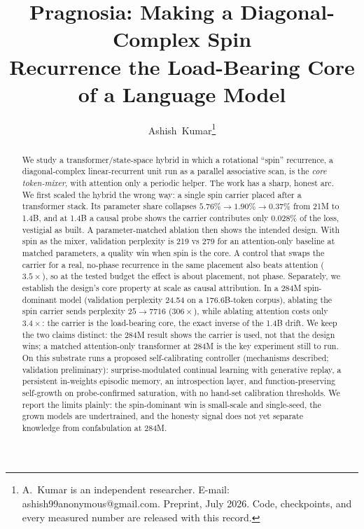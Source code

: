 \documentclass[journal]{IEEEtran}
\begin{document}
\title{Pragnosia: Making a Diagonal-Complex Spin\\ Recurrence the Load-Bearing Core of a Language Model}

\author{Ashish~Kumar\thanks{A.~Kumar is an independent researcher. E-mail: ashish99anonymous@gmail.com. Preprint, July 2026. Code, checkpoints, and every measured number are released with this record.}}


\maketitle

\begin{abstract}
We study a transformer/state-space hybrid in which a rotational ``spin'' recurrence, a diagonal-complex linear-recurrent unit run as a parallel associative scan, is the \emph{core token-mixer}, with attention only a periodic helper. The work has a sharp, honest arc. We first scaled the hybrid the wrong way: a single spin carrier placed after a transformer stack. Its parameter share collapses $5.76\% \to 1.90\% \to 0.37\%$ from 21M to 1.4B, and at 1.4B a causal probe shows the carrier contributes only 0.028\% of the loss, vestigial as built. A parameter-matched ablation then shows the intended design. With spin as the mixer, validation perplexity is 219 vs 279 for an attention-only baseline at matched parameters, a quality win when spin is the core. A control that swaps the carrier for a real, no-phase recurrence in the same placement also beats attention ($3.5\times$), so at the tested budget the effect is about placement, not phase. Separately, we establish the design's core property at scale as causal attribution. In a 284M spin-dominant model (validation perplexity 24.54 on a 176.6B-token corpus), ablating the spin carrier sends perplexity $25 \to 7716$ ($306\times$), while ablating attention costs only $3.4\times$: the carrier is the load-bearing core, the exact inverse of the 1.4B drift. We keep the two claims distinct: the 284M result shows the carrier is used, not that the design wins; a matched attention-only transformer at 284M is the key experiment still to run. On this substrate runs a proposed self-calibrating controller (mechanisms described; validation preliminary): surprise-modulated continual learning with generative replay, a persistent in-weights episodic memory, an introspection layer, and function-preserving self-growth on probe-confirmed saturation, with no hand-set calibration thresholds. We report the limits plainly: the spin-dominant win is small-scale and single-seed, the grown models are undertrained, and the honesty signal does not yet separate knowledge from confabulation at 284M.
\end{abstract}
\end{document}

